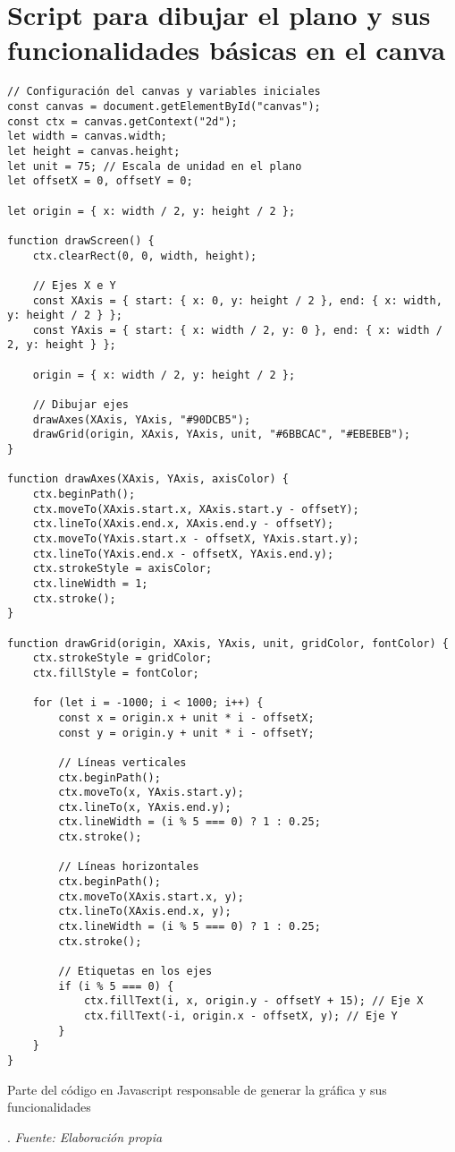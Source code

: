 \section{Script para dibujar el plano y sus funcionalidades básicas en el canva} \label{app3:canva_js}
\begin{longlisting}
	\begin{verbatim}
// Configuración del canvas y variables iniciales
const canvas = document.getElementById("canvas");
const ctx = canvas.getContext("2d");
let width = canvas.width;
let height = canvas.height;
let unit = 75; // Escala de unidad en el plano
let offsetX = 0, offsetY = 0;

let origin = { x: width / 2, y: height / 2 };

function drawScreen() {
	ctx.clearRect(0, 0, width, height);
	
	// Ejes X e Y
	const XAxis = { start: { x: 0, y: height / 2 }, end: { x: width, y: height / 2 } };
	const YAxis = { start: { x: width / 2, y: 0 }, end: { x: width / 2, y: height } };
	
	origin = { x: width / 2, y: height / 2 };
	
	// Dibujar ejes
	drawAxes(XAxis, YAxis, "#90DCB5");
	drawGrid(origin, XAxis, YAxis, unit, "#6BBCAC", "#EBEBEB");
}

function drawAxes(XAxis, YAxis, axisColor) {
	ctx.beginPath();
	ctx.moveTo(XAxis.start.x, XAxis.start.y - offsetY);
	ctx.lineTo(XAxis.end.x, XAxis.end.y - offsetY);
	ctx.moveTo(YAxis.start.x - offsetX, YAxis.start.y);
	ctx.lineTo(YAxis.end.x - offsetX, YAxis.end.y);
	ctx.strokeStyle = axisColor;
	ctx.lineWidth = 1;
	ctx.stroke();
}

function drawGrid(origin, XAxis, YAxis, unit, gridColor, fontColor) {
	ctx.strokeStyle = gridColor;
	ctx.fillStyle = fontColor;
	
	for (let i = -1000; i < 1000; i++) {
		const x = origin.x + unit * i - offsetX;
		const y = origin.y + unit * i - offsetY;
		
		// Líneas verticales
		ctx.beginPath();
		ctx.moveTo(x, YAxis.start.y);
		ctx.lineTo(x, YAxis.end.y);
		ctx.lineWidth = (i % 5 === 0) ? 1 : 0.25;
		ctx.stroke();
		
		// Líneas horizontales
		ctx.beginPath();
		ctx.moveTo(XAxis.start.x, y);
		ctx.lineTo(XAxis.end.x, y);
		ctx.lineWidth = (i % 5 === 0) ? 1 : 0.25;
		ctx.stroke();
		
		// Etiquetas en los ejes
		if (i % 5 === 0) {
			ctx.fillText(i, x, origin.y - offsetY + 15); // Eje X
			ctx.fillText(-i, origin.x - offsetX, y); // Eje Y
		}
	}
}
	\end{verbatim}
	\caption[Parte del código en Javascript responsable de generar la gráfica y sus funcionalidades] {Parte del código en Javascript responsable de generar la gráfica y sus funcionalidades}. \textit{Fuente: Elaboración propia}
\end{longlisting}

